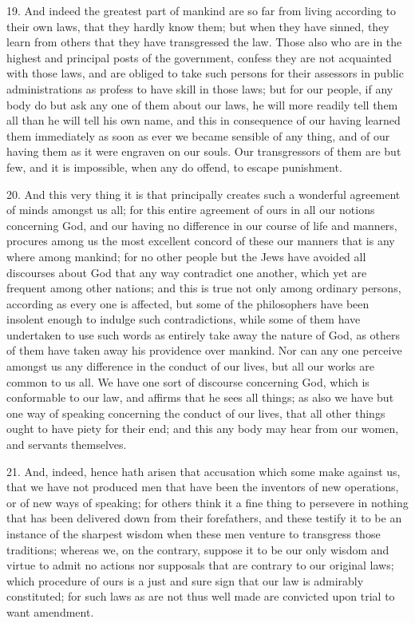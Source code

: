 19. And indeed the greatest part of mankind are so far from living
according to their own laws, that they hardly know them; but when they
have sinned, they learn from others that they have transgressed the law.
Those also who are in the highest and principal posts of the government,
confess they are not acquainted with those laws, and are obliged to take
such persons for their assessors in public administrations as profess to
have skill in those laws; but for our people, if any body do but ask any
one of them about our laws, he will more readily tell them all than he
will tell his own name, and this in consequence of our having learned them
immediately as soon as ever we became sensible of any thing, and of our
having them as it were engraven on our souls. Our transgressors of them
are but few, and it is impossible, when any do offend, to escape
punishment.

20. And this very thing it is that principally creates such a wonderful
agreement of minds amongst us all; for this entire agreement of ours in
all our notions concerning God, and our having no difference in our course
of life and manners, procures among us the most excellent concord of these
our manners that is any where among mankind; for no other people but the
Jews have avoided all discourses about God that any way contradict one
another, which yet are frequent among other nations; and this is true not
only among ordinary persons, according as every one is affected, but some
of the philosophers have been insolent enough to indulge such
contradictions, while some of them have undertaken to use such words as
entirely take away the nature of God, as others of them have taken away
his providence over mankind. Nor can any one perceive amongst us any
difference in the conduct of our lives, but all our works are common to us
all. We have one sort of discourse concerning God, which is conformable to
our law, and affirms that he sees all things; as also we have but one way
of speaking concerning the conduct of our lives, that all other things
ought to have piety for their end; and this any body may hear from our
women, and servants themselves.

21. And, indeed, hence hath arisen that accusation which some make against
us, that we have not produced men that have been the inventors of new
operations, or of new ways of speaking; for others think it a fine thing
to persevere in nothing that has been delivered down from their
forefathers, and these testify it to be an instance of the sharpest wisdom
when these men venture to transgress those traditions; whereas we, on the
contrary, suppose it to be our only wisdom and virtue to admit no actions
nor supposals that are contrary to our original laws; which procedure of
ours is a just and sure sign that our law is admirably constituted; for
such laws as are not thus well made are convicted upon trial to want
amendment.

